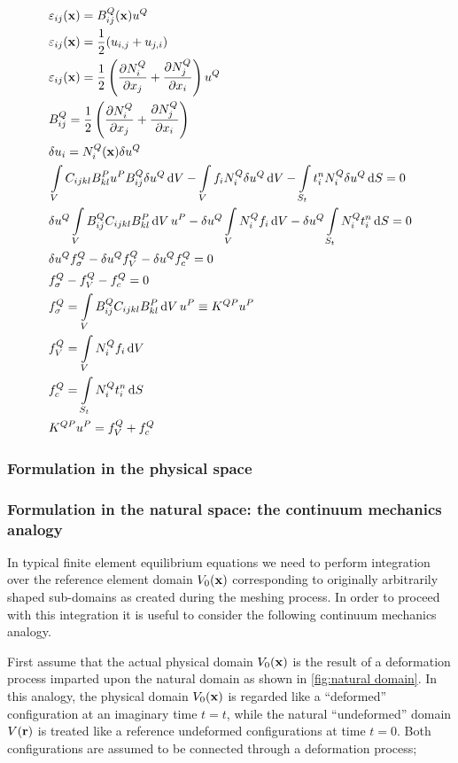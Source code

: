 \begin{align*}
&\varepsilon_{ij}(\vb x) = B_{ij}^Q(\vb x){u^Q}\\
&\varepsilon_{ij}(\vb x) = \frac{1}{2}( u_{i,j} + u_{j,i} )\\
&\varepsilon_{ij}(\vb x) = \frac{1}{2}\left(\pdv{N_i^Q}{x_j} + \pdv{N_j^Q}{x_i} \right){u^Q}\\
&B_{ij}^Q = \frac{1}{2}\left(\pdv{N_i^Q}{x_j} + \pdv{N_j^Q}{x_i} \right)\\
&\delta {u_i} = N_i^Q(\vb x)\delta {u^Q}\\
&\int\limits_V C_{ijkl} B_{kl}^P u^P B_{ij}^Q\delta u^Q \dd{V} - \int\limits_V f_i N_i^Q\delta {u^Q}\dd{V}  - \int\limits_{S_t} t_i^n N_i^Q\delta {u^Q} \dd{S} = 0\\
&\delta {u^Q}\int\limits_V B_{ij}^Q C_{ijkl} B_{kl}^P\dd{V}{u^P} - \delta {u^Q}\int\limits_V N_i^Q{f_i}\dd{V}  - \delta {u^Q}\int\limits_{S_t} N_i^Qt_i^n\dd{S} = 0 \\
&\delta u^Q f_\sigma ^Q - \delta {u^Q}f_V^Q - \delta u^Q f_c^Q = 0\\
&f_\sigma ^Q - f_V^Q - f_c^Q = 0\\
&f_\sigma ^Q = \int\limits_V B_{ij}^Q C_{ijkl} B_{kl}^P\dd{V} u^P \equiv K^{QP} u^P\\
&f_V^Q = \int\limits_V N_i^Q f_i\dd{V} \\
&f_c^Q = \int\limits_{S_t} N_i^Qt_i^n \dd{S} \\
&K^{QP} u^P = f_V^Q + f_c^Q
\end{align*}

\subsubsection{Formulation in the physical space}
\subsubsection{Formulation in the natural space: the continuum mechanics analogy}
In typical finite element equilibrium equations we need to perform integration over the reference element domain $V_0(\vb{x})$ corresponding to originally arbitrarily shaped sub-domains as created during the meshing process.  In order to proceed with this integration it is useful to consider the following continuum mechanics analogy.

First assume that the actual physical domain $V_0(\vb{x})$ is the result of a deformation process imparted upon the natural domain as shown in \cref{fig:natural domain}. In this analogy, the physical domain $V_0(\vb{x})$ is regarded like a ``deformed'' configuration at an imaginary time $t=t$, while the natural ``undeformed'' domain $V(\vb{r})$   is treated like a reference undeformed configurations at time $t=0$. Both configurations are assumed to be connected through a deformation process;


